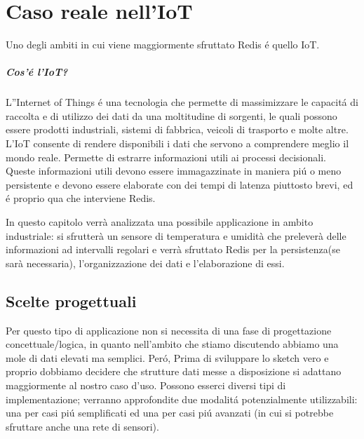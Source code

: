 \chapter{Caso reale nell'IoT}
Uno degli ambiti in cui viene maggiormente sfruttato Redis é quello IoT.
\paragraph{Cos'é l'IoT?\\}
L''Internet of Things é una tecnologia che permette di massimizzare le capacitá di raccolta e di utilizzo
dei dati da una moltitudine di sorgenti, le quali possono essere prodotti industriali, sistemi di fabbrica, veicoli
di trasporto e molte altre.
L'IoT consente di rendere disponibili i dati che servono a comprendere meglio il mondo reale.
Permette di estrarre informazioni utili ai processi decisionali.\\
Queste informazioni utili devono essere immagazzinate in maniera piú o meno persistente
e devono essere elaborate con dei tempi di latenza piuttosto brevi, ed é proprio qua che interviene Redis.

In questo capitolo verrà analizzata una possibile applicazione in ambito industriale:
si sfrutterà un sensore di temperatura e umidità che preleverà delle informazioni ad intervalli regolari e
verrà sfruttato Redis per la persistenza(se sarà necessaria), l'organizzazione dei dati e l'elaborazione di essi.

\section{Scelte progettuali}
Per questo tipo di applicazione non si necessita di una fase di progettazione concettuale/logica, in quanto
nell'ambito che stiamo discutendo abbiamo una mole di dati elevati ma semplici.
Peró, Prima di sviluppare lo sketch vero e proprio dobbiamo decidere che strutture dati messe a disposizione si adattano
maggiormente al nostro caso d'uso.
Possono esserci diversi tipi di implementazione; verranno approfondite due modalitá potenzialmente utilizzabili:
una per casi piú semplificati ed una per casi piú avanzati (in cui si potrebbe sfruttare anche una rete di sensori).

